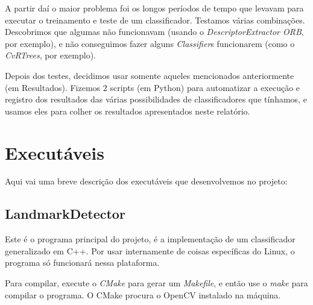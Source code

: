A partir daí o maior problema foi os longos períodos de tempo que levavam para executar o treinamento
e teste de um classificador. Testamos várias combinações. Descobrimos que algumas não funcionavam
(usando o \textit{DescriptorExtractor ORB}, por exemplo), e não conseguimos fazer alguns 
\textit{Classifier}s funcionarem (como o \textit{CvRTrees}, por exemplo).

Depois dos testes, decidimos usar somente aqueles mencionados anteriormente (em Resultados).
Fizemos 2 scripts (em Python) para automatizar a execução e registro dos resultados das várias 
possibilidades de classificadores que tínhamos, e usamos eles para colher os resultados apresentados
neste relatório.

\section{Executáveis}
Aqui vai uma breve descrição dos executáveis que desenvolvemos no projeto:

\subsection{LandmarkDetector}
Este é o programa principal do projeto, é a implementação de um classificador generalizado em C++.
Por usar internamente de coisas específicas do Linux, o programa só funcionará nessa plataforma.

Para compilar, execute o \textit{CMake} para gerar um \textit{Makefile}, e então use o \textit{make}
para compilar o programa. O CMake procura o OpenCV instalado na máquina.

